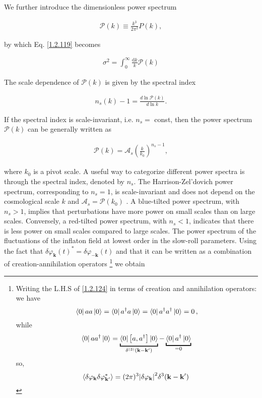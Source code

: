 We further introduce the dimensionless power spectrum

\begin{align}
    \mathcal{P}(k) \equiv \frac{k^{3}}{2 \pi^{2}} P(k), \label{1.2.120}
\end{align}



by which Eq. \eqref{1.2.119} becomes

\begin{align}
    \sigma^{2}=\int_{0}^{\infty} \frac{\mathrm{d} k}{k} \mathcal{P}(k) \label{1.2.121}
\end{align}



The scale dependence of $\mathcal{P}(k)$ is given by the spectral index

\begin{align}
    n_{s}(k)-1=\frac{d \ln \mathcal{P}(k)}{d \ln k} . \label{1.2.122}
\end{align}



If the spectral index is scale-invariant, i.e. $n_{s}=$ const, then the power spectrum $\mathcal{P}(k)$ can be generally written as

\begin{align}
    \mathcal{P}(k)= \mathcal{A}_{s}\left(\frac{k}{k_{0}}\right)^{n_{s}-1}, \label{1.2.123}
\end{align}

where $k_{0}$ is a pivot scale. A useful way to categorize different power spectra is through the spectral index, denoted by $n_s$. The Harrison-Zel'dovich power spectrum, corresponding to $n_s=1$, is scale-invariant and does not depend on the cosmological scale $k$ and $\mathcal{A}_{s} =\mathcal{P}(k_{0})$ . A blue-tilted power spectrum, with $n_s>1$, implies that perturbations have more power on small scales than on large scales. Conversely, a red-tilted power spectrum, with $n_s<1$, indicates that there is less power on small scales compared to large scales.
The power spectrum of the fluctuations of the inflaton field at lowest order in the slow-roll parameters. Using the fact that $\delta \varphi_{\mathbf{k}}(t)^{*}=\delta \varphi_{-\mathbf{k}}(t)$ and that it can be written as a combination of creation-annihilation operators
\footnote{Writing the L.H.S of \eqref{1.2.124} in terms of creation and annihilation operators: we have $$\bra{0} a a \ket{0}=\bra{0} a ^\dag a  \ket{0}= \bra{0} a ^\dag a ^\dag \ket{0}= 0 \,,$$
while $$\bra{0} a a ^\dag \ket{0} = \underbracket{\bra{0} \qty[a, a ^\dag] \ket{0}}_{\delta^{(3)} (\mathbf{k} - \mathbf{k'})} - \underbracket{\bra{0} a ^\dag \ket{0}}_{= 0} \,$$
so,
$$
\expval{ \delta \varphi _{\mathbf{k}} \delta \varphi _{\mathbf{k'}}^{*}} = (2 \pi )^3 \abs{ \delta \varphi _{\mathbf{k}}}^2 \delta^3(\mathbf{k} -\mathbf{k'})\
$$
}
we obtain

